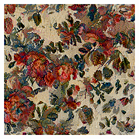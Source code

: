 \begin{figure}[]
\begin{subfigure}{\textwidth}
\begin{subfigure}{0.24\textwidth}
            \caption*{}
        \end{subfigure}
        \hfill
        \begin{subfigure}{0.24\textwidth}
            \centering
            \includegraphics[width=\textwidth]{images/04-experiment01/flowers/1000/white_proj.jpg}
            \caption*{}
        \end{subfigure}


\end{subfigure}
\end{figure}
